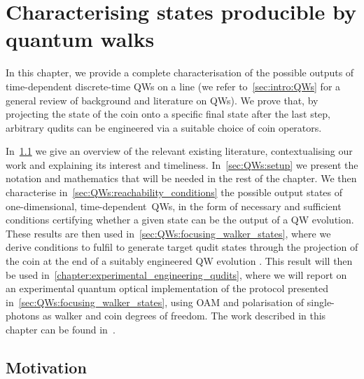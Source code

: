 
\chapter{Characterising states producible by quantum walks}
\label{chapter:quantum_walks}

In this chapter, we provide a complete characterisation of the possible outputs of time-dependent discrete-time \acfp{QW} on a line (we refer to~\cref{sec:intro:QWs} for a general review of background and literature on \acp{QW}).
We prove that, by projecting the state of the coin onto a specific final state after the last step, arbitrary qudits can be engineered via a suitable choice of coin operators.

In~\cref{sec:QWs:motivation} we give an overview of the relevant existing literature, contextualising our work and explaining its interest and timeliness.
In~\cref{sec:QWs:setup} we present the notation and mathematics that will be needed in the rest of the chapter.
We then characterise in~\cref{sec:QWs:reachability_conditions} the possible output states of one-dimensional, time-dependent~\acp{QW}, in the form of necessary and sufficient conditions certifying whether a given state can be the output of a \ac{QW} evolution.
These results are then used in~\cref{sec:QWs:focusing_walker_states}, where we derive conditions to fulfil to generate target qudit states through the projection of the coin at the end of a suitably engineered QW evolution .
This result will then be used in~\cref{chapter:experimental_engineering_qudits}, where we will report on an experimental quantum optical implementation of the protocol presented in~\cref{sec:QWs:focusing_walker_states}, using \acf{OAM} and polarisation of single-photons as walker and coin degrees of freedom.
The work described in this chapter can be found in~\cite{innocenti2017quantum}.

\section{Motivation}
\label{sec:QWs:motivation}

